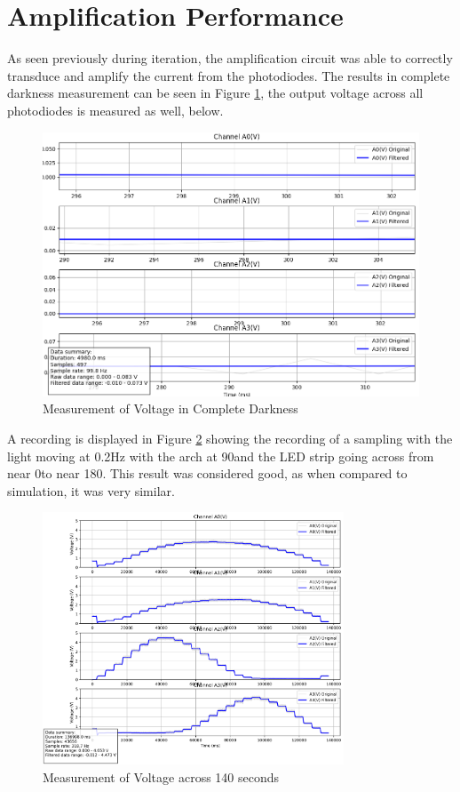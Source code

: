 \section{Amplification Performance}
As seen previously during iteration, the amplification circuit was able to correctly transduce and amplify the current from the photodiodes. The results in complete darkness measurement can be seen in Figure \ref{fig:ampPerf}, the output voltage across all photodiodes is measured as well, below.


\begin{figure}[htb]
    \centering
    \includegraphics[width=1\textwidth]{chapters/results/images/result_amplification_perf.png}
    \caption{Measurement of Voltage in Complete Darkness}
    \label{fig:ampPerf}
\end{figure}

A recording is displayed in Figure \ref{fig:recZoom} showing the recording of a sampling with the light moving at 0.2Hz with the arch at 90\textdegree and the LED strip going across from near 0\textdegree to near 180\textdegree. This result was considered good, as when compared to simulation, it was very similar.
\begin{figure}[htb]
    \centering
    \includegraphics[width=0.8\textwidth]{chapters/results/images/120s_zoomed.png}
    \caption{Measurement of Voltage across 140 seconds}
    \label{fig:recZoom}
\end{figure}


